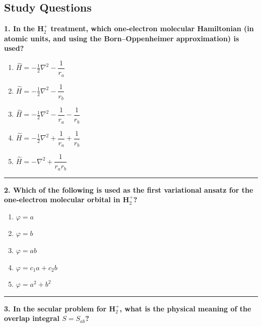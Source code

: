 \documentclass[
  english,
  9pt,
]{extbook}
\providecommand{\tightlist}{%
  \setlength{\itemsep}{0pt}\setlength{\parskip}{0pt}}
\theoremstyle{definition}
\theoremstyle{definition}
\theoremstyle{definition}
\theoremstyle{definition}
\theoremstyle{remark}
\begin{document}
\subsection{Study Questions}\label{quest11}

\textbf{1. In the H\(_2^+\) treatment, which one‑electron molecular Hamiltonian (in atomic units, and using the Born--Oppenheimer approximation) is used?}

\begin{enumerate}
\def\labelenumi{\alph{enumi}.}
\tightlist
\item
  \(\hat{H} = -\tfrac{1}{2}\nabla^2 - \dfrac{1}{r_a}\)\\
\item
  \(\hat{H} = -\tfrac{1}{2}\nabla^2 - \dfrac{1}{r_b}\)\\
\item
  \(\hat{H} = -\tfrac{1}{2}\nabla^2 - \dfrac{1}{r_a} - \dfrac{1}{r_b}\)\\
\item
  \(\hat{H} = -\tfrac{1}{2}\nabla^2 + \dfrac{1}{r_a} + \dfrac{1}{r_b}\)\\
\item
  \(\hat{H} = -\nabla^2 + \dfrac{1}{r_a r_b}\)
\end{enumerate}

\begin{center}\rule{0.5\linewidth}{0.5pt}\end{center}

\textbf{2. Which of the following is used as the first variational ansatz for the one‑electron molecular orbital in H\(_2^+\)?}

\begin{enumerate}
\def\labelenumi{\alph{enumi}.}
\tightlist
\item
  \(\varphi = a\)\\
\item
  \(\varphi = b\)\\
\item
  \(\varphi = a b\)\\
\item
  \(\varphi = c_1 a + c_2 b\)
\item
  \(\varphi = a^2 + b^2\)
\end{enumerate}

\begin{center}\rule{0.5\linewidth}{0.5pt}\end{center}

\textbf{3. In the secular problem for H\(_2^+\), what is the physical meaning of the overlap integral \(S = S_{ab}\)?}
\end{document}
